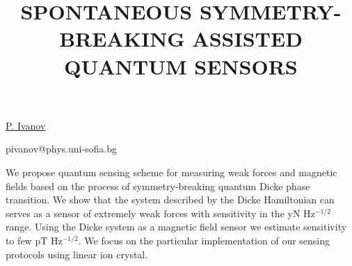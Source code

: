 \title{SPONTANEOUS SYMMETRY-BREAKING ASSISTED QUANTUM SENSORS}

\underline{P. Ivanov}

{\normalsize{
\vspace{-4mm} \unisofia


\email pivanov@phys.uni-sofia.bg}}

We propose quantum sensing scheme for measuring weak forces and magnetic fields based on the process of symmetry-breaking quantum Dicke phase transition. We show that the system described by the Dicke Hamiltonian can serves as a sensor of extremely weak forces with sensitivity in the yN Hz$^{-1/2}$ range. Using the Dicke system as a magnetic field sensor we estimate sensitivity to few pT Hz$^{-1/2}$. We focus on the particular implementation of our sensing protocols using linear ion crystal.

\vspace{\baselineskip}
